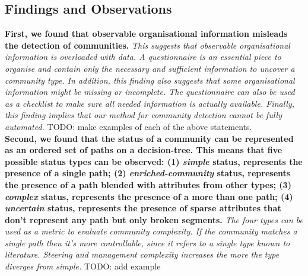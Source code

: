 \documentclass[conference]{IEEEtran}
\begin{document}
\subsection{Findings and Observations}

{\bf First, we found that observable organisational information misleads the detection of communities.}
%
\emph{This suggests that observable organisational information is overloaded with data. A questionnaire is an essential piece to organise and contain only the necessary and sufficient information to uncover a community type. In addition, this finding also suggests that some organisational information might be missing or incomplete. The questionnaire can also be used as a checklist to make sure all needed information is actually available. Finally, this finding implies that our method for community detection cannot be fully automated.}
TODO: make examples of each of the above statements.\\

{\bf Second, we found that the status of a community can be represented as an ordered set of paths on a decision-tree. This means that five possible status types can be observed: (1) \emph{simple} status, represents the presence of a single path; (2) \emph{enriched-community} status, represents the presence of a path blended with attributes from other types; (3) \emph{complex} status, represents the presence of a more than one path; (4) \emph{uncertain} status, represents the presence of sparse attributes that don't represent any path but only broken segments.}
\emph{The four types can be used as a metric to evaluate community complexity. If the community matches a single path then it's more controllable, since it refers to a single type known to literature. Steering and management complexity increases the more the type diverges from simple.}
TODO: add example\\
\end{document}
